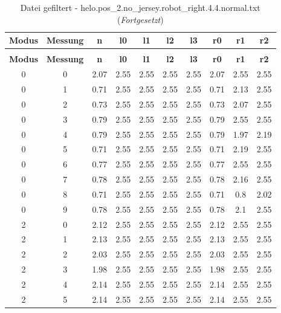 \clearpage{}
\begin{longtable}{|c|c||c||c|c|c|c||c|c|c|}
	\caption{Datei gefiltert - helo.pos\_2.no\_jersey.robot\_right.4.4.normal.txt} \label{tab:helo.pos-2.no-jersey.robot-right.4.4.normal.txt} \\ \hline
	\textbf{Modus} & \textbf{Messung} & \textbf{n} & \textbf{l0} & \textbf{l1} & \textbf{l2} & \textbf{l3} & \textbf{r0} & \textbf{r1} & \textbf{r2}\\ \hline
	\endfirsthead
	\caption[]{Datei gefiltert - helo.pos\_2.no\_jersey.robot\_right.4.4.normal.txt (\emph{Fortgesetzt})} \\ \hline
	\textbf{Modus} & \textbf{Messung} & \textbf{n} & \textbf{l0} & \textbf{l1} & \textbf{l2} & \textbf{l3} & \textbf{r0} & \textbf{r1} & \textbf{r2}\\ \hline
	\endhead
	0 & 0 & 2.07 & 2.55 & 2.55 & 2.55 & 2.55 & 2.07 & 2.55 & 2.55 \\ \hline
	0 & 1 & 0.71 & 2.55 & 2.55 & 2.55 & 2.55 & 0.71 & 2.13 & 2.55 \\ \hline
	0 & 2 & 0.73 & 2.55 & 2.55 & 2.55 & 2.55 & 0.73 & 2.07 & 2.55 \\ \hline
	0 & 3 & 0.79 & 2.55 & 2.55 & 2.55 & 2.55 & 0.79 & 2.55 & 2.55 \\ \hline
	0 & 4 & 0.79 & 2.55 & 2.55 & 2.55 & 2.55 & 0.79 & 1.97 & 2.19 \\ \hline
	0 & 5 & 0.71 & 2.55 & 2.55 & 2.55 & 2.55 & 0.71 & 2.19 & 2.55 \\ \hline
	0 & 6 & 0.77 & 2.55 & 2.55 & 2.55 & 2.55 & 0.77 & 2.55 & 2.55 \\ \hline
	0 & 7 & 0.78 & 2.55 & 2.55 & 2.55 & 2.55 & 0.78 & 2.16 & 2.55 \\ \hline
	0 & 8 & 0.71 & 2.55 & 2.55 & 2.55 & 2.55 & 0.71 & 0.8 & 2.02 \\ \hline
	0 & 9 & 0.78 & 2.55 & 2.55 & 2.55 & 2.55 & 0.78 & 2.1 & 2.55 \\ \hline
	2 & 0 & 2.12 & 2.55 & 2.55 & 2.55 & 2.55 & 2.12 & 2.55 & 2.55 \\ \hline
	2 & 1 & 2.13 & 2.55 & 2.55 & 2.55 & 2.55 & 2.13 & 2.55 & 2.55 \\ \hline
	2 & 2 & 2.03 & 2.55 & 2.55 & 2.55 & 2.55 & 2.03 & 2.55 & 2.55 \\ \hline
	2 & 3 & 1.98 & 2.55 & 2.55 & 2.55 & 2.55 & 1.98 & 2.55 & 2.55 \\ \hline
	2 & 4 & 2.14 & 2.55 & 2.55 & 2.55 & 2.55 & 2.14 & 2.55 & 2.55 \\ \hline
	2 & 5 & 2.14 & 2.55 & 2.55 & 2.55 & 2.55 & 2.14 & 2.55 & 2.55 \\ \hline

\end{longtable}
